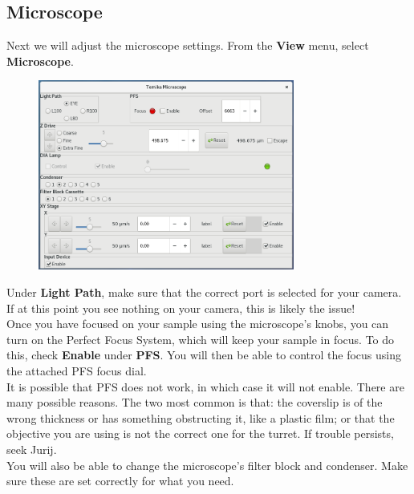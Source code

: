 \documentclass{article}
\begin{document}
\newpage

\subsection{Microscope}

Next we will adjust the microscope settings. From the \textbf{View} menu, select \textbf{Microscope}.\\

\begin{figure}[h!]
\centering
\includegraphics[width=0.75\textwidth]{microscope}
\end{figure}

Under \textbf{Light Path}, make sure that the correct port is selected for your camera. If at this point you see nothing on your camera, this is likely the issue!\\

Once you have focused on your sample using the microscope's knobs, you can turn on the Perfect Focus System, which will keep your sample in focus. To do this, check \textbf{Enable} under \textbf{PFS}. You will then be able to control the focus using the attached PFS focus dial.\\

It is possible that PFS does not work, in which case it will not enable. There are many possible reasons. The two most common is that: the coverslip is of the wrong thickness or has something obstructing it, like a plastic film; or that the objective you are using is not the correct one for the turret. If trouble persists, seek Jurij.\\

You will also be able to change the microscope's filter block and condenser. Make sure these are set correctly for what you need.\\ 
\end{document}
